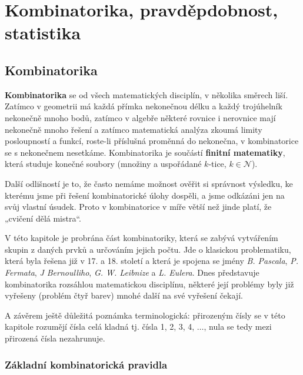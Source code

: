 \chapter{Kombinatorika, pravděpdobnost, statistika}\label{mai:IchapIII}
\minitoc
  \section{Kombinatorika}\label{mai:IchapIIIsecI}
    \textbf{Kombinatorika} se od všech matematických disciplín, v několika směrech liší. Zatímco v 
    geometrii má každá přímka nekonečnou délku a každý trojúhelník nekonečně mnoho bodů, zatímco v 
    algebře některé rovnice i nerovnice mají nekonečně mnoho řešení a zatímco matematická analýza 
    zkoumá limity posloupností a funkcí, roste-li příslušná proměnná do nekonečna, v kombinatorice 
    se s nekonečnem nesetkáme. Kombinatorika je součástí \textbf{finitní matematiky}, která studuje 
    konečné soubory (množiny a uspořádané \(k\)-tice, \(k\in \mathcal{N}\)). 
    
    Další odlišností je to, že často nemáme možnost ověřit si správnost výsledku, ke kterému jsme 
    při řešení kombinatorické úlohy dospěli, a jsme odkázáni jen na svůj vlastní úsudek. Proto v 
    kombinatorice v míře větší než jinde platí, že „cvičení dělá mistra“. 
    
    V této kapitole je probrána část kombinatoriky, která se zabývá vytvářením skupin z daných 
    prvků a určováním jejich počtu. Jde o klasickou problematiku, která byla řešena již v 17. a 18. 
    století a která je spojena se jmény \emph{B. Pascala}, \emph{P. Fermata}, \emph{J Bernoulliho}, 
    \emph{G. W. Leibnize}  a \emph{L. Eulera}. Dnes představuje kombinatorika rozsáhlou 
    matematickou disciplínu, některé její problémy byly již vyřešeny (problém čtyř barev) mnohé 
    další na své vyřešení čekají. 
    
    A závěrem ještě důležitá poznámka terminologická: přirozeným čísly se v této kapitole rozumějí 
    čísla celá kladná tj. čísla 1, 2, 3, 4, \(\ldots\), nula se tedy mezi přirozená čísla 
    nezahrunuje. \cite[s.~7]{calda2008matematika} 
    
    \subsection{Základní kombinatorická pravidla}
    

